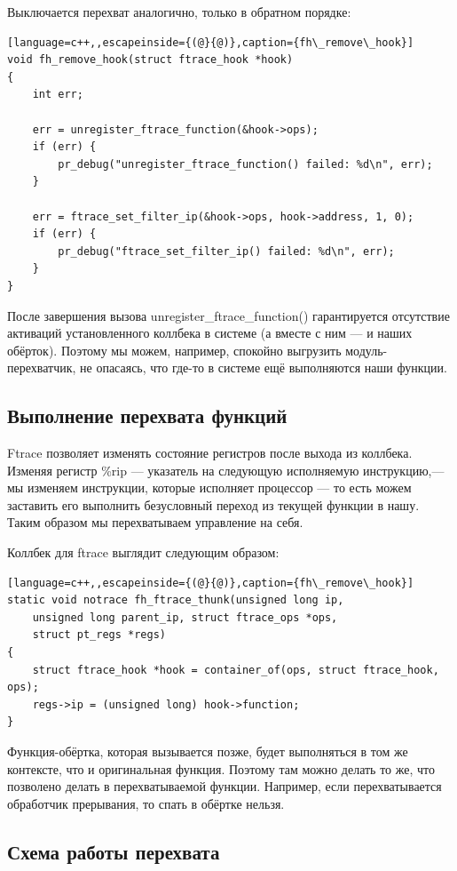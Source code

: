 \newpage
Выключается перехват аналогично, только в обратном порядке:
\begin{lstlisting}[language=c++,,escapeinside={(@}{@)},caption={fh\_remove\_hook}]
void fh_remove_hook(struct ftrace_hook *hook)
{
	int err;
	
	err = unregister_ftrace_function(&hook->ops);
	if (err) {
		pr_debug("unregister_ftrace_function() failed: %d\n", err);
	}
	
	err = ftrace_set_filter_ip(&hook->ops, hook->address, 1, 0);
	if (err) {
		pr_debug("ftrace_set_filter_ip() failed: %d\n", err);
	}
}
\end{lstlisting}

После завершения вызова unregister\_ftrace\_function() гарантируется отсутствие активаций установленного коллбека в системе (а вместе с ним — и наших обёрток). Поэтому мы можем, например, спокойно выгрузить модуль-перехватчик, не опасаясь, что где-то в системе ещё выполняются наши функции.

\subsection{Выполнение перехвата функций}

Ftrace позволяет изменять состояние регистров после выхода из коллбека. Изменяя регистр \%rip — указатель на следующую исполняемую инструкцию,— мы изменяем инструкции, которые исполняет процессор — то есть можем заставить его выполнить безусловный переход из текущей функции в нашу. Таким образом мы перехватываем управление на себя.

Коллбек для ftrace выглядит следующим образом:
\begin{lstlisting}[language=c++,,escapeinside={(@}{@)},caption={fh\_remove\_hook}]
static void notrace fh_ftrace_thunk(unsigned long ip, 
	unsigned long parent_ip, struct ftrace_ops *ops, 
	struct pt_regs *regs)
{
	struct ftrace_hook *hook = container_of(ops, struct ftrace_hook, ops);
	regs->ip = (unsigned long) hook->function;
}
\end{lstlisting}

Функция-обёртка, которая вызывается позже, будет выполняться в том же контексте, что и оригинальная функция. Поэтому там можно делать то же, что позволено делать в перехватываемой функции. Например, если перехватывается обработчик прерывания, то спать в обёртке нельзя.

\subsection{Схема работы перехвата}

